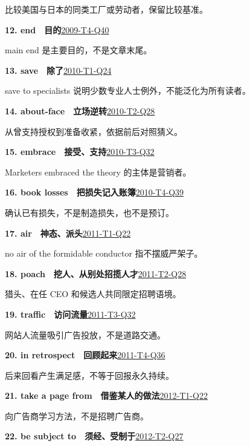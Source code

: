\documentclass[11pt,a4paper]{article}
\begin{document}
比较美国与日本的同类工厂或劳动者，保留比较基准。\par
{}\noindent\textbf{12. end　目的}\hfill \hyperref[idx-2009-T4-Q40]{2009-T4-Q40}\par
main end 是主要目的，不是文章末尾。\par
{}\noindent\textbf{13. save　除了}\hfill \hyperref[idx-2010-T1-Q24]{2010-T1-Q24}\par
save to specialists 说明少数专业人士例外，不能泛化为所有读者。\par
{}\noindent\textbf{14. about-face　立场逆转}\hfill \hyperref[idx-2010-T2-Q28]{2010-T2-Q28}\par
从曾支持授权到准备收紧，依据前后对照猜义。\par
{}\noindent\textbf{15. embrace　接受、支持}\hfill \hyperref[idx-2010-T3-Q32]{2010-T3-Q32}\par
Marketers embraced the theory 的主体是营销者。\par
{}\noindent\textbf{16. book losses　把损失记入账簿}\hfill \hyperref[idx-2010-T4-Q39]{2010-T4-Q39}\par
确认已有损失，不是制造损失，也不是预订。\par
{}\noindent\textbf{17. air　神态、派头}\hfill \hyperref[idx-2011-T1-Q22]{2011-T1-Q22}\par
no air of the formidable conductor 指不摆威严架子。\par
{}\noindent\textbf{18. poach　挖人、从别处招揽人才}\hfill \hyperref[idx-2011-T2-Q28]{2011-T2-Q28}\par
猎头、在任 CEO 和候选人共同限定招聘语境。\par
{}\noindent\textbf{19. traffic　访问流量}\hfill \hyperref[idx-2011-T3-Q32]{2011-T3-Q32}\par
网站人流量吸引广告投放，不是道路交通。\par
{}\noindent\textbf{20. in retrospect　回顾起来}\hfill \hyperref[idx-2011-T4-Q36]{2011-T4-Q36}\par
后来回看产生满足感，不等于回报永久持续。\par
{}\noindent\textbf{21. take a page from　借鉴某人的做法}\hfill \hyperref[idx-2012-T1-Q22]{2012-T1-Q22}\par
向广告商学习方法，不是招聘广告商。\par
{}\noindent\textbf{22. be subject to　须经、受制于}\hfill \hyperref[idx-2012-T2-Q27]{2012-T2-Q27}\par
\end{document}
